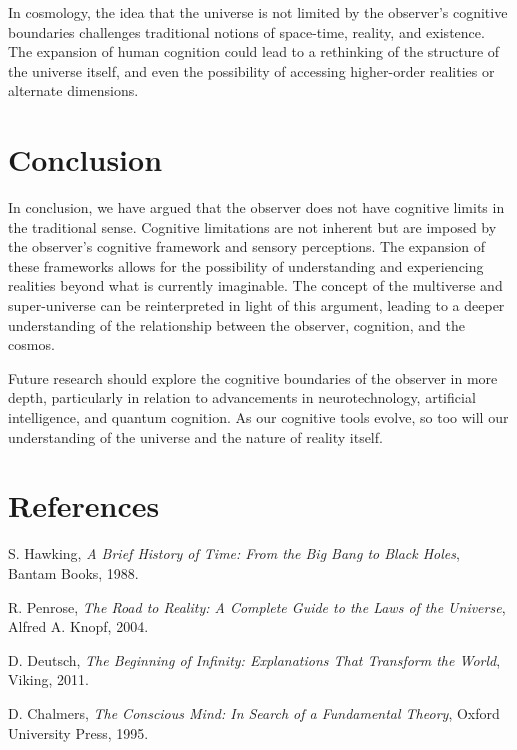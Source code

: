 \documentclass[twocolumn]{article}
\begin{document}
    In cosmology, the idea that the universe is not limited by the observer's cognitive boundaries challenges
    traditional notions of space-time, reality, and existence.
    The expansion of human cognition could lead to a rethinking of the structure of the universe itself,
    and even the possibility of accessing higher-order realities or alternate dimensions.


    \section{Conclusion}
    \label{sec:conclusion}

    In conclusion, we have argued that the observer does not have cognitive limits in the traditional sense.
    Cognitive limitations are not inherent but are imposed by the observer's cognitive framework and sensory perceptions.
    The expansion of these frameworks allows for the possibility of understanding and experiencing realities
    beyond what is currently imaginable.
    The concept of the multiverse and super-universe can be reinterpreted in light of this argument,
    leading to a deeper understanding of the relationship between the observer, cognition, and the cosmos.

    Future research should explore the cognitive boundaries of the observer in more depth,
    particularly in relation to advancements in neurotechnology, artificial intelligence, and quantum cognition.
    As our cognitive tools evolve, so too will our understanding of the universe and the nature of reality itself.


    \section*{References}
    \begin{thebibliography}{9}

        S. Hawking,
        \textit{A Brief History of Time: From the Big Bang to Black Holes},
        Bantam Books, 1988.

        R. Penrose,
        \textit{The Road to Reality: A Complete Guide to the Laws of the Universe},
        Alfred A. Knopf, 2004.

        D. Deutsch,
        \textit{The Beginning of Infinity: Explanations That Transform the World},
        Viking, 2011.

        D. Chalmers,
        \textit{The Conscious Mind: In Search of a Fundamental Theory},
        Oxford University Press, 1995.

    \end{thebibliography}
\end{document}
